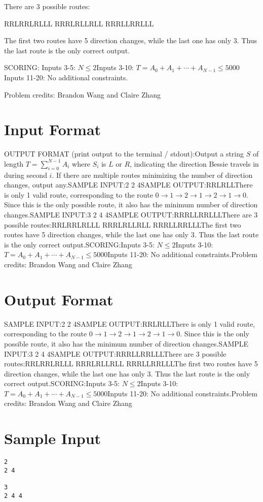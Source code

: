 \documentclass[12pt]{article}
\begin{document}
There are 3 possible routes:


RRLRRLRLLL
RRRLRLLRLL
RRRLLRRLLL

The first two routes have 5 direction changes, while the last one has only 3. 
Thus the last route is the only correct output.

SCORING:
Inputs 3-5: $N\le 2$Inputs 3-10: $T = A_0 + A_1 + \cdots + A_{N-1} \leq 5000$Inputs 11-20: No additional constraints.


Problem credits: Brandon Wang and Claire Zhang



\section*{Input Format}
OUTPUT FORMAT (print output to the terminal / stdout):Output a string $S$ of length $T = \sum_{i=0}^{N-1} A_i$ where $S_i$ is $L$ or
$R$, indicating the direction Bessie travels in during second $i$. If there are
multiple routes minimizing the number of direction changes, output any.SAMPLE INPUT:2
2 4SAMPLE OUTPUT:RRLRLLThere is only 1 valid route, corresponding to the route
$0\to 1 \to 2 \to 1\to 2 \to 1\to 0$. Since this is the only possible route, it
also has the minimum number of direction changes.SAMPLE INPUT:3
2 4 4SAMPLE OUTPUT:RRRLLRRLLLThere are 3 possible routes:RRLRRLRLLL
RRRLRLLRLL
RRRLLRRLLLThe first two routes have 5 direction changes, while the last one has only 3. 
Thus the last route is the only correct output.SCORING:Inputs 3-5: $N\le 2$Inputs 3-10: $T = A_0 + A_1 + \cdots + A_{N-1} \leq 5000$Inputs 11-20: No additional constraints.Problem credits: Brandon Wang and Claire Zhang

\section*{Output Format}
SAMPLE INPUT:2
2 4SAMPLE OUTPUT:RRLRLLThere is only 1 valid route, corresponding to the route
$0\to 1 \to 2 \to 1\to 2 \to 1\to 0$. Since this is the only possible route, it
also has the minimum number of direction changes.SAMPLE INPUT:3
2 4 4SAMPLE OUTPUT:RRRLLRRLLLThere are 3 possible routes:RRLRRLRLLL
RRRLRLLRLL
RRRLLRRLLLThe first two routes have 5 direction changes, while the last one has only 3. 
Thus the last route is the only correct output.SCORING:Inputs 3-5: $N\le 2$Inputs 3-10: $T = A_0 + A_1 + \cdots + A_{N-1} \leq 5000$Inputs 11-20: No additional constraints.Problem credits: Brandon Wang and Claire Zhang

\section*{Sample Input}
\begin{verbatim}
2
2 4

3
2 4 4
\end{verbatim}
\end{document}
